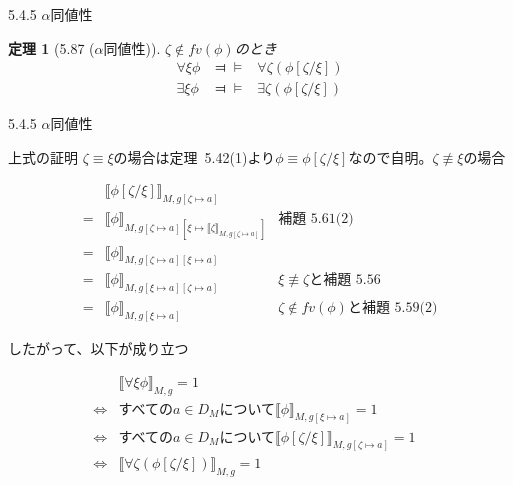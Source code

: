 \documentclass[dvipdfmx,11pt]{beamer}
\newtheorem{theo}[theorem]{定理}
\begin{document}
\begin{frame}{5.4.5 \(\alpha\)同値性}
  \begin{theo}[5.87 (\(\alpha\)同値性)]
    \(\zeta\not\in\textit{fv}(\phi)\)のとき
    \begin{eqnarray*}
      \forall \xi \phi & \Dashv\vDash & \forall \zeta ( \phi [ \zeta / \xi ] ) \\
      \exists \xi \phi & \Dashv\vDash & \exists \zeta ( \phi [ \zeta / \xi ] )
    \end{eqnarray*}
  \end{theo}
\end{frame}

\begin{frame}{5.4.5 \(\alpha\)同値性}
  \begin{block}{上式の証明}
    \(\zeta\equiv\xi\)の場合は定理~5.42(1)より\(\phi\equiv\phi[\zeta/\xi]\)なので自明。\(\zeta\nequiv\xi\)の場合

    \[
    \begin{array}{rll}
      & \llbracket \phi [ \zeta / \xi ] \rrbracket_{M,g[\zeta\mapsto a]} & \\
      = & \llbracket \phi \rrbracket_{M,g[\zeta\mapsto a][\xi\mapsto\llbracket\zeta\rrbracket_{M,g[\zeta\mapsto a]}]} & \textit{補題~5.61(2)}\\
      = & \llbracket \phi \rrbracket_{M,g[\zeta\mapsto a][\xi\mapsto a]} & \\
      = & \llbracket \phi \rrbracket_{M,g[\xi\mapsto a][\zeta\mapsto a]} & \xi\nequiv\zeta\textit{と補題~5.56} \\
      = & \llbracket \phi \rrbracket_{M,g[\xi\mapsto a]} & \zeta\not\in\textit{fv}(\phi)\textit{と補題~5.59(2)}
    \end{array}
    \]

    したがって、以下が成り立つ

    \[
    \begin{array}{rll}
      & \llbracket \forall \xi \phi \rrbracket_{M,g} = 1 & \\
      \iff & \textit{すべての}a\in D_M\textit{について}\llbracket\phi\rrbracket_{M,g[\xi\mapsto a]} = 1 & \\
      \iff & \textit{すべての}a\in D_M\textit{について}\llbracket\phi[\zeta/\xi]\rrbracket_{M,g[\zeta\mapsto a]} = 1 & \\
      \iff & \llbracket\forall\zeta(\phi[\zeta/\xi])\rrbracket_{M,g} = 1 &
    \end{array}
    \]
  \end{block}
\end{frame}
\end{document}

